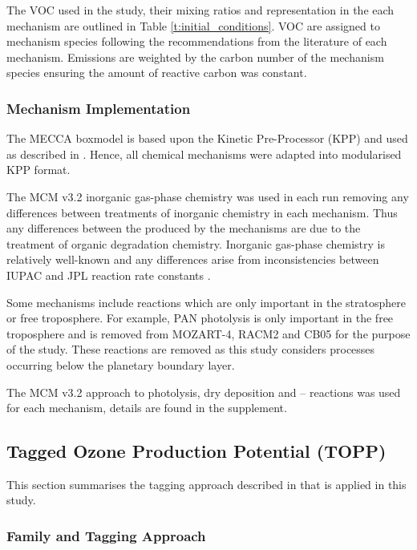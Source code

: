 The VOC used in the study, their mixing ratios and representation in the each mechanism are outlined in Table \ref{t:initial_conditions}.
VOC are assigned to mechanism species following the recommendations from the literature of each mechanism.
Emissions are weighted by the carbon number of the mechanism species ensuring the amount of reactive carbon was constant.

\subsubsection{Mechanism Implementation} %

The MECCA boxmodel \citep{Sander:2005} is based upon the Kinetic Pre-Processor (KPP) \citep{Damian:2002} and used as described in \citet{Butler:2011}. 
Hence, all chemical mechanisms were adapted into modularised KPP format.

The MCM v3.2 inorganic gas-phase chemistry was used in each run removing any differences between treatments of inorganic chemistry in each mechanism.
Thus any differences between the  produced by the mechanisms are due to the treatment of organic degradation chemistry.
Inorganic gas-phase chemistry is relatively well-known and any differences arise from inconsistencies between IUPAC and JPL reaction rate constants \citep{Emmerson:2009}.

Some mechanisms include reactions which are only important in the stratosphere or free troposphere.
For example, PAN photolysis is only important in the free troposphere \citep{Harwood:2003} and is removed from MOZART-4, RACM2 and CB05 for the purpose of the study. 
These reactions are removed as this study considers processes occurring below the planetary boundary layer.

The MCM v3.2 approach to photolysis, dry deposition and -- reactions was used for each mechanism, details are found in the supplement.

\subsection{Tagged Ozone Production Potential (TOPP)}
This section summarises the tagging approach described in \citet{Butler:2011} that is applied in this study.

\subsubsection[Ox Family and Tagging Approach]{ Family and Tagging Approach} \label{ss:tagging} %

